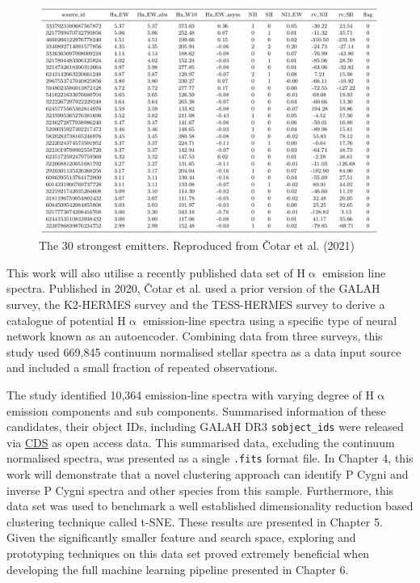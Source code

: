 \begin{figure}[!htb]
\centering
\includegraphics[scale=.45]{figures/cotartable.png}
\caption{The 30 strongest emitters. Reproduced from Čotar et al. (2021)\cite{vcotar2021galah}}
\end{figure}

This work will also utilise a recently published data set of H$\upalpha$ emission line spectra. Published in 2020, Čotar et al.\cite{vcotar2021galah} used a prior version of the GALAH survey\cite{de2015galah}, the K2-HERMES survey\cite{wittenmyer2018k2} and the TESS-HERMES survey\cite{sharma2018tess} to derive a catalogue of potential H$\upalpha$ emission-line spectra using a specific type of neural network known as an autoencoder. Combining data from three surveys, this study used 669,845 continuum normalised stellar spectra as a data input source and included a small fraction of repeated observations. 

The study identified 10,364 emission-line spectra with varying degree of H$\upalpha$ emission components and sub components. Summarised information of these candidates, their object IDs, including GALAH DR3 \texttt{sobject\_ids} were released via \href{https://cdsweb.u-strasbg.fr/}{CDS} as open access data. This summarised data, excluding the continuum normalised spectra, was presented as a single \texttt{.fits} format file. In Chapter 4, this work will demonstrate that a novel clustering approach can identify P Cygni and inverse P Cygni spectra and other species from this sample. Furthermore, this data set was used to benchmark a well established dimensionality reduction based clustering technique called t-SNE. These results are presented in Chapter 5. Given the significantly smaller feature and search space, exploring and prototyping techniques on this data set proved extremely beneficial when developing the full machine learning pipeline presented in Chapter 6.

